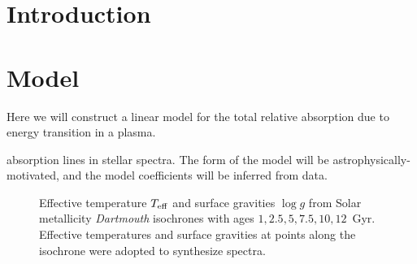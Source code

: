 \documentclass{aastex61}
\newcommand{\project}[1]{\textsl{#1}}
\newcommand{\teff}{T_{\rm eff}}
\newcommand{\logg}{\log{g}}
\begin{document}
\keywords{}

\section{Introduction} 
\label{sec:introduction}







\section{Model}
\label{sec:model}


Here we will construct a linear model for the total relative absorption due to 
energy transition in a plasma. 



absorption lines in stellar spectra.
The form of the model will be astrophysically-motivated, and the model coefficients
will be inferred from data. 







\begin{figure}
	\caption{
		Effective temperature $\teff$ and surface gravities $\logg$ from
		Solar metallicity \project{Dartmouth} isochrones \citep{dartmouth}
		with ages ${1, 2.5, 5, 7.5, 10, 12}$~Gyr. Effective temperatures
		and surface gravities at points along the isochrone were adopted
		to synthesize spectra.\label{fig:simple_solar_isochrone}}
\end{figure}
\end{document}

